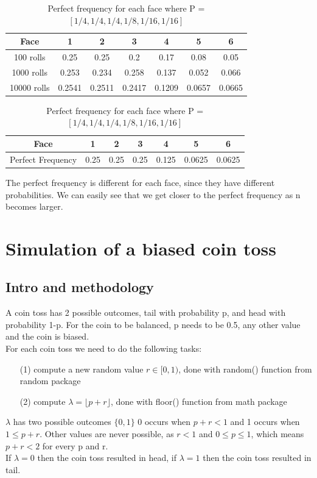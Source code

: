 \documentclass[a4paper]{article}
\begin{document}
\begin{table}[H]
\begin{center}
\begin{tabular}{|c|c|c|c|c|c|c|}
\hline
Face        & 1      & 2      & 3      & 4      & 5      & 6      \\ \hline
100 rolls   & 0.25   & 0.25   & 0.2    & 0.17   & 0.08   & 0.05   \\ \hline
1000 rolls  & 0.253  & 0.234  & 0.258  & 0.137  & 0.052  & 0.066  \\ \hline
10000 rolls & 0.2541 & 0.2511 & 0.2417 & 0.1209 & 0.0657 & 0.0665 \\ \hline
\end{tabular}
\caption*{\label{BD} Frequency of each face for different number of rolls}
\vspace{0.6cm}
\begin{tabular}{|c|c|c|c|c|c|c|}
\hline
Face              & 1    & 2    & 3    & 4     & 5      & 6      \\ \hline
Perfect Frequency & 0.25 & 0.25 & 0.25 & 0.125 & 0.0625 & 0.0625 \\ \hline
\end{tabular}
\caption*{\label{BD} Perfect frequency for each face where P = $[ 1/4, 1/4, 1/4, 1/8, 1/16, 1/16]$}
\end{center}
\end{table}
The perfect frequency is different for each face, since they have different probabilities. We can easily see that we get closer to the perfect frequency as n becomes larger.\\


\newpage
\section*{Simulation of a biased coin toss}
\subsection*{Intro and methodology}
A coin toss has 2 possible outcomes, tail with probability p, and head with probability 1-p. For the coin to be balanced, p needs to be 0.5, any other value and the coin is biased.\\
For each coin toss we need to do the following tasks:
\begin{itemize}
\item [(1)] compute a new random value $r \in [0,1)$, done with random() function from random package
\item [(2)] compute $\lambda = \lfloor p + r \rfloor$, done with floor() function from math package
\end{itemize}
$\lambda$ has two possible outcomes $\{0, 1\}$ 0 occurs when $p + r < 1$ and 1 occurs when $1 \leq p + r$. Other values are never possible, as $r < 1$ and $0 \leq p \leq 1$, which means $p + r < 2$ for every p and r.\\
If $\lambda = 0$ then the coin toss resulted in head, if $\lambda = 1$ then the coin toss resulted in tail.
\end{document}
